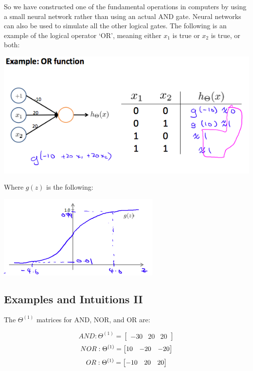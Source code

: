 \documentclass[UTF8]{article}
\begin{document}
So we have constructed one of the fundamental operations in computers by using a small neural network rather than using an actual AND gate. Neural networks can also be used to simulate all the other logical gates. The following is an example of the logical operator `OR', meaning either $x_1$ is true or $x_2$ is true, or both:

\includegraphics[width = \textwidth]{NotePics/8_3_1.png}

Where $g(z)$ is the following:

\includegraphics[width = \textwidth]{NotePics/8_3_2.png}

\subsection{Examples and Intuitions II}

The $\Theta^{(1)}$ matrices for AND, NOR, and OR are:

\[ AND:\Theta^{(1)} =\begin{bmatrix}-30 & 20 & 20\end{bmatrix} \]
\[ NOR:\newline\Theta^{(1)} = \begin{bmatrix}10 & -20 & -20\end{bmatrix} \]
\[ OR:\newline\Theta^{(1)} = \begin{bmatrix}-10 & 20 & 20\end{bmatrix} \]
\end{document}
